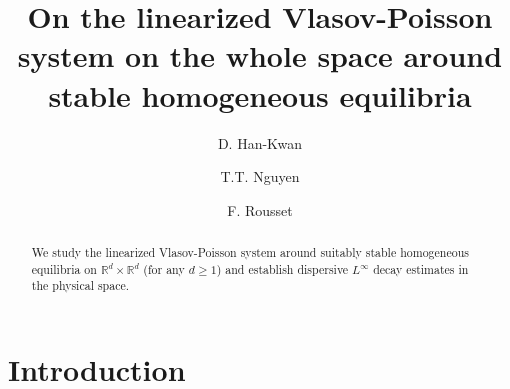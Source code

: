 \documentclass[11pt]{amsart}
\numberwithin{equation}{section}
\newcommand{\R}{\mathbb{R}}
\begin{document}
\title{On the linearized Vlasov-Poisson system on the whole space around stable homogeneous equilibria}
\author{D. Han-Kwan} 
\address{Centre de Math\'ematiques Laurent Schwartz (UMR 7640), Ecole Polytechnique, Institut Polytechnique de Paris, 91128 Palaiseau Cedex, France}
\author{T.T. Nguyen}
\address{Department of Mathematics, Penn State University, State College, PA 16803, USA.}
\author{F. Rousset}
\address{Laboratoire de Math\'ematiques d'Orsay (UMR 8628), Universit\'e Paris-Saclay, 91405 Orsay Cedex, France.}


\maketitle 

\begin{abstract}
We study the linearized Vlasov-Poisson system around suitably stable  homogeneous equilibria on $\R^d\times \R^d$ (for any $d \geq 1$) and establish  dispersive $L^\infty$ decay estimates in the physical space.
\end{abstract}

\section{Introduction}
\end{document}
